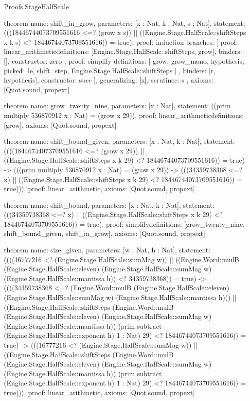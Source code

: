 \begin{lexlean}{Proofs.StageHalfScale}
\begin{semanticmodule}
theorem{
  name: shift_in_grow,
  parameters: [x : Nat, k : Nat, s : Nat],
  statement: (((18446744073709551616 <=? (grow x s)) || ((Engine.Stage.HalfScale::shiftSteps x k s) <? 18446744073709551616)) = true),
  proof: induction{
    branches: [
      {
        proof: linear_arithmetic{definitions: [Engine.Stage.HalfScale::shiftSteps, grow]},
        binders: [],
        constructor: zero
      },
      {
        proof: simplify{
          definitions: [
            grow,
            grow_mono,
            hypothesis,
            picked_le,
            shift_step,
            Engine.Stage.HalfScale::shiftSteps
          ]
        },
        binders: [r, hypothesis],
        constructor: succ
      }
    ],
    generalizing: [x],
    scrutinee: s
  },
  axioms: [Quot.sound, propext]
}

theorem{
  name: grow_twenty_nine,
  parameters: [x : Nat],
  statement: ((prim multiply 536870912 x : Nat) = (grow x 29)),
  proof: linear_arithmetic{definitions: [grow]},
  axioms: [Quot.sound, propext]
}

theorem{
  name: shift_bound_given,
  parameters: [x : Nat, k : Nat],
  statement: ((((18446744073709551616 <=? (grow x 29)) || ((Engine.Stage.HalfScale::shiftSteps x k 29) <? 18446744073709551616)) = true) -> (((prim multiply 536870912 x : Nat) = (grow x 29)) -> (((34359738368 <=? x) || ((Engine.Stage.HalfScale::shiftSteps x k 29) <? 18446744073709551616)) = true))),
  proof: linear_arithmetic{},
  axioms: [Quot.sound, propext]
}

theorem{
  name: shift_bound,
  parameters: [x : Nat, k : Nat],
  statement: (((34359738368 <=? x) || ((Engine.Stage.HalfScale::shiftSteps x k 29) <? 18446744073709551616)) = true),
  proof: simplify{definitions: [grow_twenty_nine, shift_bound_given, shift_in_grow]},
  axioms: [Quot.sound, propext]
}

theorem{
  name: size_given,
  parameters: [w : Nat, h : Nat],
  statement: ((((16777216 <? (Engine.Stage.HalfScale::sumMag w)) || ((Engine.Word::mulB (Engine.Stage.HalfScale::eleven) (Engine.Stage.HalfScale::sumMag w) (Engine.Stage.HalfScale::mantissa h)) <? 34359738368)) = true) -> ((((34359738368 <=? (Engine.Word::mulB (Engine.Stage.HalfScale::eleven) (Engine.Stage.HalfScale::sumMag w) (Engine.Stage.HalfScale::mantissa h))) || ((Engine.Stage.HalfScale::shiftSteps (Engine.Word::mulB (Engine.Stage.HalfScale::eleven) (Engine.Stage.HalfScale::sumMag w) (Engine.Stage.HalfScale::mantissa h)) (prim subtract (Engine.Stage.HalfScale::exponent h) 1 : Nat) 29) <? 18446744073709551616)) = true) -> (((16777216 <? (Engine.Stage.HalfScale::sumMag w)) || ((Engine.Stage.HalfScale::shiftSteps (Engine.Word::mulB (Engine.Stage.HalfScale::eleven) (Engine.Stage.HalfScale::sumMag w) (Engine.Stage.HalfScale::mantissa h)) (prim subtract (Engine.Stage.HalfScale::exponent h) 1 : Nat) 29) <? 18446744073709551616)) = true))),
  proof: linear_arithmetic{},
  axioms: [Quot.sound, propext]
}


\end{semanticmodule}
\end{lexlean}
